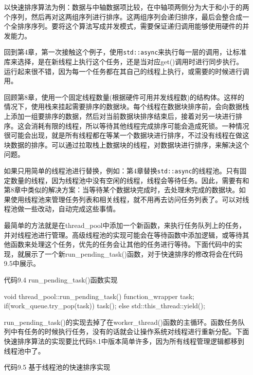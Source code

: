 以快速排序算法为例：数据与中轴数据项比较，在中轴项两侧分为大于和小于的两个序列，然后再对这两组序列进行排序。这两组序列会递归排序，最后会整合成一个全排序序列。要将这个算法写成并发模式，需要保证递归调用能够使用硬件的并发能力。

回到第4章，第一次接触这个例子，使用\texttt{std::async}来执行每一层的调用，让标准库来选择，是在新线程上执行这个任务，还是当对应get()调用时进行同步执行。运行起来很不错，因为每一个任务都在其自己的线程上执行，或需要的时候进行调用。

回顾第8章，使用一个固定线程数量(根据硬件可用并发线程数)的结构体。这样的情况下，使用栈来挂起需要排序的数据块。每个线程在数据块排序前，会向数据栈上添加一组要排序的数据，然后对当前数据块排序结束后，接着对另一块进行排序。这会消耗有限的线程，所以等待其他线程完成排序可能会造成死锁。一种情况很可能会出现，就是所有线程都在等某一个数据块进行排序，不过没有线程在做这块数据的排序。可以通过拉取栈上数据块的线程，对数据块进行排序，来解决这个问题。

如果只用简单的线程池进行替换，例如：第4章替换\texttt{std::async}的线程池。只有固定数量的线程，因为线程池中没有空闲的线程，线程会等待任务。因此，需要有和第8章中类似的解决方案：当等待某个数据块完成时，去处理未完成的数据块。如果使用线程池来管理任务列表和相关线程，就不用再去访问任务列表了。可以对线程池做一些改动，自动完成这些事情。

最简单的方法就是在thread\_pool中添加一个新函数，来执行任务队列上的任务，并对线程池进行管理。高级线程池的实现可能会在等待函数中添加逻辑，或等待其他函数来处理这个任务，优先的任务会让其他的任务进行等待。下面代码中的实现，就展示了一个新run\_pending\_task()函数，对于快速排序的修改将会在代码9.5中展示。

代码9.4 run\_pending\_task()函数实现

\begin{cpp}
void thread_pool::run_pending_task()
{
  function_wrapper task;
  if(work_queue.try_pop(task))
  {
    task();
  }
  else
  {
    std::this_thread::yield();
  }
}
\end{cpp}

run\_pending\_task()的实现去掉了在worker\_thread()函数的主循环。函数任务队列中有任务的时候执行任务，没有的话就会让操作系统对线程进行重新分配。下面快速排序算法的实现要比代码8.1中版本简单许多，因为所有线程管理逻辑都移到线程池中了。

代码9.5 基于线程池的快速排序实现

